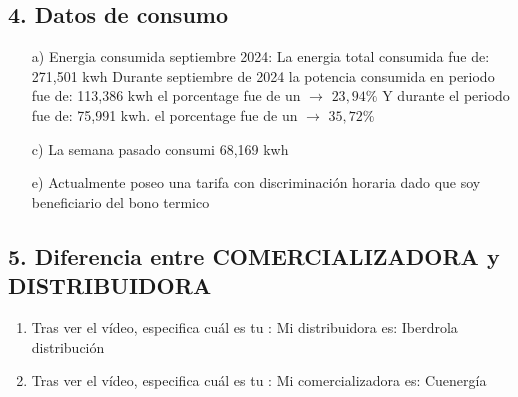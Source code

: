 \documentclass{report}
\begin{document}
      \subsection*{4. Datos de consumo}
        \begin{enumerate}
          \item[a)] Energia consumida septiembre 2024:
            \fspace{0em}La energia total consumida fue de: 271,501 kwh
            \fspace{0em}Durante septiembre de 2024 la potencia consumida en periodo  fue de: 113,386 kwh el porcentage fue de un $\to$ $23,94\%$
            \fspace{0em}Y durante el periodo  fue de: 75,991 kwh. el porcentage fue de un $\to$  $35,72\%$

          \item[c)] La semana pasado consumi 68,169 kwh

          \item[e)] Actualmente poseo una tarifa con discriminación horaria dado que soy beneficiario del bono termico
 
          
        \end{enumerate}



      \subsection*{5. Diferencia entre COMERCIALIZADORA y DISTRIBUIDORA}
        \begin{enumerate}[label=\alph*)]
          \item Tras ver el vídeo, especifica cuál es tu : Mi distribuidora es: Iberdrola distribución
          \item Tras ver el vídeo, especifica cuál es tu : Mi comercializadora es: Cuenergía
          
        \end{enumerate}
\end{document}

